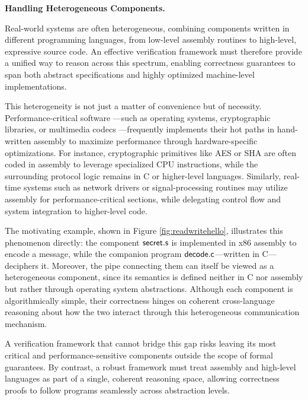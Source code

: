 \begin{challenge}
  \label{challenge:multi-language}
  \textbf{Handling Heterogeneous Components.}

  Real-world systems are often heterogeneous,
  combining components written in different programming languages,
  from low-level assembly routines to high-level,
  expressive source code.
  An effective verification framework
  must therefore provide a unified way
  to reason across this spectrum,
  enabling correctness guarantees
  to span both abstract specifications
  and highly optimized machine-level implementations.

  This heterogeneity is not just a matter of convenience
  but of necessity.
  Performance-critical software%
  ---such as operating systems,
  cryptographic libraries,
  or multimedia codecs%
  ---frequently implements their hot paths
  in hand-written assembly
  to maximize performance
  through hardware-specific optimizations.
  For instance,
  cryptographic primitives
  like AES or SHA are often coded
  in assembly to leverage specialized CPU instructions,
  while the surrounding protocol logic
  remains in C or higher-level languages.
  Similarly, real-time systems
  such as network drivers or signal-processing routines
  may utilize assembly for performance-critical sections,
  while delegating control flow and system integration
  to higher-level code.

  The motivating example,
  shown in Figure \ref{fig:readwritehello},
  illustrates this phenomenon directly:
  the component $ \mathsf{secret.s} $ is implemented in x86 assembly to encode a message,
  while the companion program $ \mathsf{decode.c} $---written in C---deciphers it.
  Moreover, the pipe connecting them can itself be viewed as a heterogeneous component,
  since its semantics is defined neither in C nor assembly
  but rather through operating system abstractions.
  Although each component is algorithmically simple,
  their correctness hinges on coherent cross-language reasoning
  about how the two interact through this heterogeneous communication mechanism.

  A verification framework
  that cannot bridge this gap risks
  leaving its most critical
  and performance-sensitive components
  outside the scope of formal guarantees.
  By contrast,
  a robust framework must treat assembly
  and high-level languages
  as part of a single, coherent reasoning space,
  allowing correctness proofs
  to follow programs seamlessly across abstraction levels.

\end{challenge}

